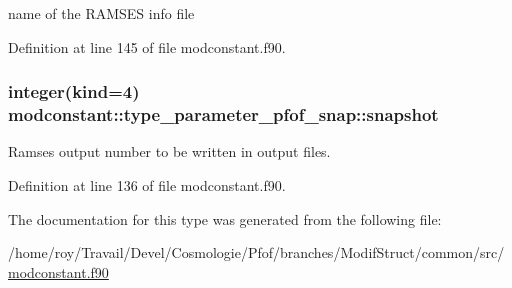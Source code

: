 name of the R\-A\-M\-S\-E\-S info file 



Definition at line 145 of file modconstant.\-f90.

\hypertarget{structmodconstant_1_1type__parameter__pfof__snap_aa9924ed26e50de32aa9bb74c85aa0d32}{
\subsubsection[{snapshot}]{\setlength{\rightskip}{0pt plus 5cm}integer(kind=4) modconstant\-::type\-\_\-parameter\-\_\-pfof\-\_\-snap\-::snapshot}}\label{structmodconstant_1_1type__parameter__pfof__snap_aa9924ed26e50de32aa9bb74c85aa0d32}


Ramses output number to be written in output files. 



Definition at line 136 of file modconstant.\-f90.



The documentation for this type was generated from the following file\-:\begin{DoxyCompactItemize}
\item 
/home/roy/\-Travail/\-Devel/\-Cosmologie/\-Pfof/branches/\-Modif\-Struct/common/src/\hyperlink{modconstant_8f90}{modconstant.\-f90}\end{DoxyCompactItemize}
